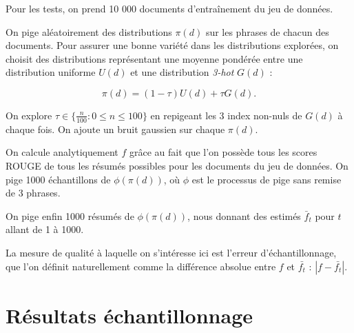 Pour les tests, on prend 10 000 documents d'entraînement du jeu de données.

On pige aléatoirement des distributions $\pi(d)$ sur les phrases de chacun des documents.
Pour assurer une bonne variété dans les distributions explorées, on choisit des
distributions représentant une moyenne pondérée entre une distribution uniforme
$U(d)$ et une distribution \textit{3-hot} $G(d)$ :

\begin{equation}
    \pi(d) = (1 - \tau) U(d) + \tau G(d).
\end{equation}

On explore $\tau \in \{\frac{n}{100}: 0 \leq n \leq 100\}$ en repigeant les 3
index non-nuls de $G(d)$ à chaque fois. On ajoute un bruit gaussien sur chaque $\pi(d)$.

On calcule analytiquement $f$ grâce au fait que l'on possède tous les scores
ROUGE de tous les résumés possibles pour les documents du jeu de données.
On pige 1000 échantillons de $\phi(\pi(d))$, où $\phi$ est le processus de
pige sans remise de 3 phrases.

On pige enfin 1000 résumés de $\phi(\pi(d))$, nous donnant des estimés $\bar{f}_t$
pour $t$ allant de 1 à 1000.

La mesure de qualité à laquelle on s'intéresse ici est l'erreur d'échantillonnage,
que l'on définit naturellement comme la différence absolue entre $f$ et $\bar{f_t}$
: $\left|f - \bar{f_t}\right|$.

\section{Résultats échantillonnage}


